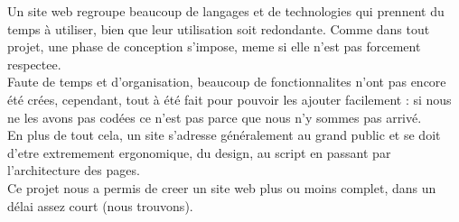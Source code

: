 
Un site web regroupe beaucoup de langages et de technologies qui prennent du temps à utiliser, bien que leur utilisation soit redondante.
Comme dans tout projet, une phase de conception s'impose, meme si elle n'est pas forcement respectee.\\

Faute de temps et d'organisation, beaucoup de fonctionnalites n'ont pas encore été crées, cependant, tout à été fait pour pouvoir les ajouter facilement : si nous ne les avons pas codées ce n'est pas parce que nous n'y sommes pas arrivé.\\

En plus de tout cela, un site s'adresse généralement au grand public et se doit d'etre extremement ergonomique, du design, au script en passant par l'architecture des pages.\\

Ce projet nous a permis de creer un site web plus ou moins complet, dans un délai assez court (nous trouvons).

